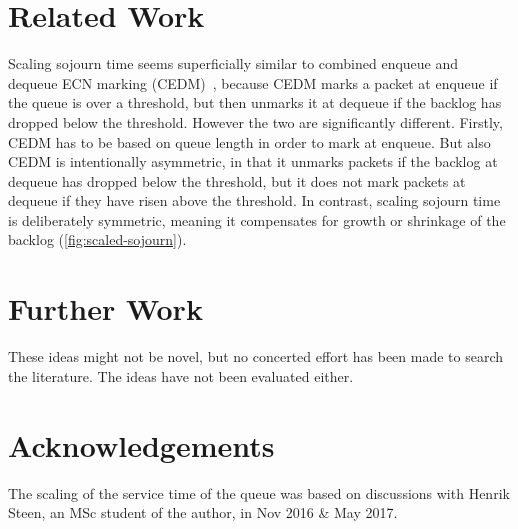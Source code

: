 \section{Related Work}\label{sec:related}

Scaling sojourn time seems superficially similar to combined enqueue and dequeue ECN marking (CEDM)~\cite{Shan17:CEDM}, because CEDM marks a packet at enqueue if the queue is over a threshold, but then unmarks it at dequeue if the backlog has dropped below the threshold. However the two are significantly different. Firstly, CEDM has to be based on queue length in order to mark at enqueue. But also CEDM is intentionally asymmetric, in that it unmarks packets if the backlog at dequeue has dropped below the threshold, but it does not mark packets at dequeue if they have risen above the threshold. In contrast, scaling sojourn time is deliberately symmetric, meaning it compensates for growth or shrinkage of the backlog (\autoref{fig:scaled-sojourn}).

\section{Further Work}

These ideas might not be novel, but no concerted effort has been made to search the literature. The ideas have not been evaluated either.

\section{Acknowledgements}\label{sigqdyntr_acks}

The scaling of the service time of the queue was based on discussions with Henrik Steen, an MSc student of the author, in Nov 2016 \& May 2017.